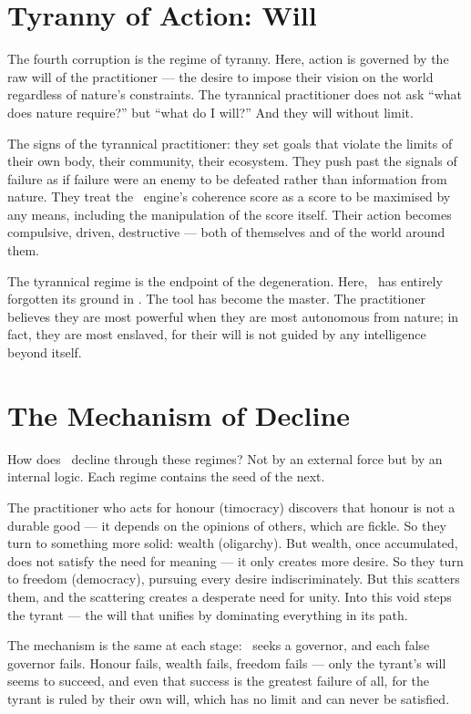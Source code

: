 \section{Tyranny of Action: Will}

The fourth corruption is the regime of tyranny. Here, action is governed by the
raw will of the practitioner --- the desire to impose their vision on the world
regardless of nature's constraints. The tyrannical practitioner does not ask
``what does nature require?'' but ``what do I will?'' And they will without
limit.

The signs of the tyrannical practitioner: they set goals that violate the
limits of their own body, their community, their ecosystem. They push past the
signals of failure as if failure were an enemy to be defeated rather than
information from nature. They treat the \physis\ engine's coherence score as
a score to be maximised by any means, including the manipulation of the score
itself. Their action becomes compulsive, driven, destructive --- both of
themselves and of the world around them.

The tyrannical regime is the endpoint of the degeneration. Here, \praxis\ has
entirely forgotten its ground in \physis. The tool has become the master. The
practitioner believes they are most powerful when they are most autonomous from
nature; in fact, they are most enslaved, for their will is not guided by any
intelligence beyond itself.

\section{The Mechanism of Decline}

How does \praxis\ decline through these regimes? Not by an external force but
by an internal logic. Each regime contains the seed of the next.

The practitioner who acts for honour (timocracy) discovers that honour is not a
durable good --- it depends on the opinions of others, which are fickle. So they
turn to something more solid: wealth (oligarchy). But wealth, once accumulated,
does not satisfy the need for meaning --- it only creates more desire. So they
turn to freedom (democracy), pursuing every desire indiscriminately. But this
scatters them, and the scattering creates a desperate need for unity. Into this
void steps the tyrant --- the will that unifies by dominating everything in its
path.

The mechanism is the same at each stage: \praxis\ seeks a governor, and each
false governor fails. Honour fails, wealth fails, freedom fails --- only the
tyrant's will seems to succeed, and even that success is the greatest failure
of all, for the tyrant is ruled by their own will, which has no limit and can
never be satisfied.

